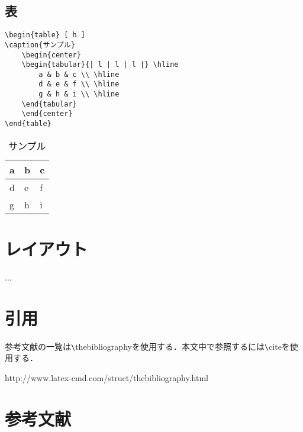 \documentclass[11pt,a4paper]{jsarticle}
\begin{document}
\subsection{表}

\begin{lstlisting}
\begin{table} [ h ]
\caption{サンプル}
	\begin{center}
	\begin{tabular}{| l | l | l |} \hline
		a & b & c \\ \hline
		d & e & f \\ \hline
		g & h & i \\ \hline
	\end{tabular}
	\end{center}
\end{table}
\end{lstlisting}

\begin{table} [ h ]
\caption{サンプル}
	\begin{center}
	\begin{tabular}{| l | l | l |} \hline
		a & b & c \\ \hline
		d & e & f \\ \hline
		g & h & i \\ \hline
	\end{tabular}
	\end{center}
\end{table}


\section{レイアウト}
...

\section{引用}
参考文献の一覧は\verb|\|thebibliographyを使用する．本文中で参照するには\verb|\|citeを使用する\cite{bibliography}．

\begin{thebibliography}{9}
	 http://www.latex-cmd.com/struct/thebibliography.html
\end{thebibliography}



\section{参考文献}
\end{document}
